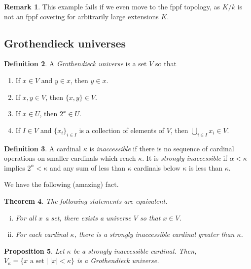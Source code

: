 \documentclass{amsart}
\newtheorem{theorem}{Theorem}[section]
\newtheorem{proposition}[theorem]{Proposition}
\theoremstyle{definition}
\newtheorem{definition}[theorem]{Definition}
\newtheorem{remark}[theorem]{Remark}
\theoremstyle{remark}
\newcommand{\abs}[1] {
  \left| #1 \right|}
\begin{document}
\begin{remark}
    This example fails if we even move to the fppf topology, as $K/k$ is not an
    fppf covering for arbitrarily large extensions $K$.
\end{remark}

\subsection{Grothendieck universes}

\begin{definition}
    A \textit{Grothendieck universe} is a set $V$ so that
    \begin{enumerate}
        \item If $x \in V$ and $y \in x$, then $y \in x$.
        \item If $x, y \in V$, then $\{x, y\} \in V$.
        \item If $x \in U$, then $2^x \in U$.
        \item If $I \in V$ and $\{x_i\}_{i \in I}$ is a collection of elements
            of $V$, then $\bigcup_{i \in I} x_i \in V$.
    \end{enumerate}
\end{definition}

\begin{definition}
    A cardinal $\kappa$ is \textit{inaccessible} if there is no sequence of
    cardinal operations on smaller cardinals which reach $\kappa$. It is
    \textit{strongly inaccessible} if $\alpha < \kappa$ implies $2^{\alpha} <
    \kappa$ and any sum of less than $\kappa$ cardinals below $\kappa$ is less
    than $\kappa$.
\end{definition}

We have the following (amazing) fact.

\begin{theorem}
    The following statements are equivalent.
    \begin{enumerate}[(i)]
        \item For all $x$ a set, there exists a universe $V$ so that $x \in V$.
        \item For each cardinal $\kappa$, there is a strongly inaccessible
            cardinal greater than $\kappa$.
    \end{enumerate}
\end{theorem}

\begin{proposition}
    Let $\kappa$ be a strongly inaccessible cardinal. Then, $V_{\kappa} = \{x
    \text{ a set} \mid \abs{x} < \kappa\}$ is a Grothendieck universe.
\end{proposition}
\end{document}
